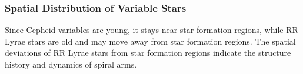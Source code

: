 \documentclass[letterpaper,11pt]{article}
\begin{document}
\subsubsection{Spatial Distribution of Variable Stars}

Since Cepheid variables are young, it stays near star formation regions, while RR Lyrae stars are old and may move away from star formation regions. The spatial deviations of RR Lyrae stars from star formation regions indicate the structure history and dynamics of spiral arms.






\end{document}
